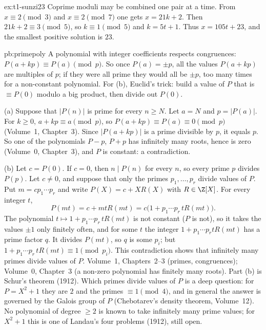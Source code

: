 \begin{solution}{ex:t1-sunzi23}
\idea Coprime moduli may be combined one pair at a time.
\writeup From $x\equiv 2\pmod 3$ and $x\equiv 2\pmod 7$ one gets $x=21k+2$. Then $21k+2\equiv 3\pmod 5$, so $k\equiv 1\pmod 5$ and $k=5t+1$. Thus $x=105t+23$, and the smallest positive solution is $23$.
\end{solution}

\begin{solution}{pb:primepoly}
\idea A polynomial with integer coefficients respects congruences: $P(a+kp)\equiv P(a)\pmod p$. So once $P(a)=\pm p$, all the
values $P(a+kp)$ are multiples of $p$; if they were all prime they would all be $\pm p$, too many times for a non-constant
polynomial. For (b), Euclid's trick: build a value of $P$ that is $\equiv P(0)$ modulo a big product, then divide out
$P(0)$.

\writeup (a) Suppose that $|P(n)|$ is prime for every $n\ge N$. Let $a=N$ and $p=|P(a)|$. For $k\ge0$,
$a+kp\equiv a\pmod p$, so $P(a+kp)\equiv P(a)\equiv0\pmod p$ (Volume~1, Chapter~3). Since $|P(a+kp)|$ is a prime divisible by
$p$, it equals $p$. So one of the polynomials $P-p$, $P+p$ has infinitely many roots, hence is zero (Volume~0, Chapter~3), and
$P$ is constant: a contradiction.

(b) Let $c=P(0)$. If $c=0$, then $n\mid P(n)$ for every $n$, so every prime $p$ divides $P(p)$. Let $c\ne0$, and suppose that
only the primes $p_1,\dots,p_r$ divide values of $P$. Put $m=cp_1\cdots p_r$ and write $P(X)=c+XR(X)$ with $R\in\Z[X]$. For
every integer $t$,
\[
P(mt)=c+mtR(mt)=c\bigl(1+p_1\cdots p_r\,tR(mt)\bigr).
\]
The polynomial $t\mapsto1+p_1\cdots p_r\,tR(mt)$ is not constant ($P$ is not), so it takes the values $\pm1$ only finitely
often, and for some $t$ the integer $1+p_1\cdots p_rtR(mt)$ has a prime factor $q$. It divides $P(mt)$, so $q$ is some $p_i$;
but $1+p_1\cdots p_r\,tR(mt)\equiv1\pmod{p_i}$. This contradiction shows that infinitely many primes divide values of $P$.
\tools Volume~1, Chapters~2--3 (primes, congruences); Volume~0, Chapter~3 (a non-zero polynomial has finitely many roots).
\leads Part (b) is Schur's theorem (1912). Which primes divide values of $P$ is a deep question: for $P=X^2+1$ they are $2$
and the primes $\equiv1\pmod4$, and in general the answer is governed by the Galois group of $P$ (Chebotarev's density
theorem, Volume~12). No polynomial of degree $\ge2$ is known to take infinitely many prime values; for $X^2+1$ this is one of
Landau's four problems (1912), still open.
\end{solution}

